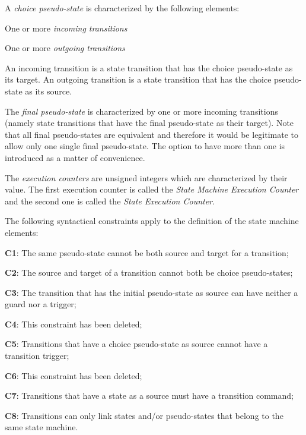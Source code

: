A \emph{choice pseudo-state} is characterized by the following elements:

\begin{fw_itemize}
\item One or more \emph{incoming transitions} 
\item One or more \emph{outgoing transitions}
\end{fw_itemize}

An incoming transition is a state transition that has the choice pseudo-state as its target. An outgoing transition is a state transition that has the 
choice pseudo-state as its source.

The \emph{final pseudo-state} is characterized by one or more incoming transitions (namely state transitions that have the final pseudo-state as their target). 
Note that all final pseudo-states are equivalent and therefore it would be legitimate to allow only one single final pseudo-state. The option to have more 
than one is introduced as a matter of convenience.

The \emph{execution counters} are unsigned integers which are characterized by their value.
The first execution counter is called the \emph{State Machine Execution Counter} and the second one
is called the \emph{State Execution Counter}.

The following syntactical constraints apply to the definition of the state machine elements:

\begin{fw_itemize}
\item{\textbf{C1}}: The same pseudo-state cannot be both source and target for a transition;
\item{\textbf{C2}}: The source and target of a transition cannot both be choice pseudo-states;
\item{\textbf{C3}}: The transition that has the initial pseudo-state as source can have neither a guard nor a trigger;
\item{\textbf{C4}}: This constraint has been deleted;
\item{\textbf{C5}}: Transitions that have a choice pseudo-state as source cannot have a transition trigger;
\item{\textbf{C6}}: This constraint has been deleted;
\item{\textbf{C7}}: Transitions that have a state as a source must have a transition command;
\item{\textbf{C8}}: Transitions can only link states and/or pseudo-states that belong to the same state machine.
\end{fw_itemize}

